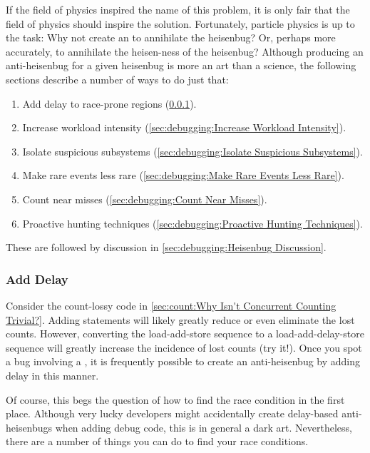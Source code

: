 If the field of physics inspired the name of this problem, it is only
fair that the field of physics should inspire the solution.
Fortunately, particle physics is up to the task:
Why not create an  to annihilate the heisenbug?
Or, perhaps more accurately, to annihilate the heisen-ness of
the heisenbug?
Although producing an anti-heisenbug for a given heisenbug is more an
art than a science, the following sections describe a number of ways to
do just that:

\begin{enumerate}
\item	Add delay to race-prone regions (\cref{sec:debugging:Add Delay}).
\item	Increase workload intensity
	(\cref{sec:debugging:Increase Workload Intensity}).
\item	Isolate suspicious subsystems
	(\cref{sec:debugging:Isolate Suspicious Subsystems}).
\item	Make rare events less rare
	(\cref{sec:debugging:Make Rare Events Less Rare}).
\item	Count near misses (\cref{sec:debugging:Count Near Misses}).
\item	Proactive hunting techniques
	(\cref{sec:debugging:Proactive Hunting Techniques}).
\end{enumerate}

These are followed by discussion in
\cref{sec:debugging:Heisenbug Discussion}.

\subsubsection{Add Delay}
\label{sec:debugging:Add Delay}

Consider the count-lossy code in
\cref{sec:count:Why Isn't Concurrent Counting Trivial?}.
Adding  statements will likely greatly reduce or even
eliminate the lost counts.
However, converting the load-add-store sequence to a load-add-delay-store
sequence will greatly increase the incidence of lost counts (try it!).
Once you spot a bug involving a , it is frequently possible
to create an anti-heisenbug by adding delay in this manner.

Of course, this begs the question of how to find the race condition in
the first place.
Although very lucky developers might accidentally create delay-based
anti-heisenbugs when adding debug code, this is in general a dark art.
Nevertheless, there are a number of things you can do to find your race
conditions.

